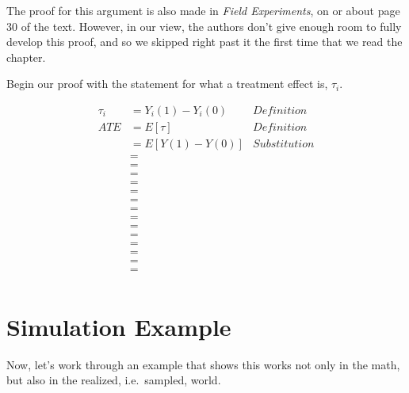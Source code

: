 \documentclass[
]{book}
\begin{document}
The proof for this argument is also made in \emph{Field Experiments}, on
or about page 30 of the text. However, in our view, the authors don't
give enough room to fully develop this proof, and so we skipped right
past it the first time that we read the chapter.

Begin our proof with the statement for what a treatment effect is,
\(\tau_{i}\).

\[
  \begin{aligned} 
    \tau_{i}    &= Y_{i}(1) - Y_{i}(0)    & Definition   \\ 
    ATE         &= E[\tau]                & Definition   \\
                &= E[Y(1) - Y(0)]         & Substitution \\
                &=                                       \\
                &=                                       \\
                &=                                       \\
                &=                                       \\
                &=                                       \\
                &=                                       \\
                &=                                       \\
                &=                                       \\
                &=                                       \\
                &=                                       \\
                &=                                       \\
                &=                                       \\
                &=                                       \\
                &=                                       \\
  \end{aligned}
\]

\hypertarget{simulation-example}{%
\section{Simulation Example}\label{simulation-example}}

Now, let's work through an example that shows this works not only in the
math, but also in the realized, i.e.~sampled, world.
\end{document}
